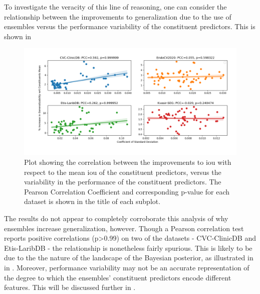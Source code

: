 To investigate the veracity of this line of reasoning, one can consider the relationship between the improvements to generalization due to the use of ensembles versus the performance variability of the constituent predictors. This is shown in  
\begin{figure}[h]
    \centering
    \hspace*{-1.9cm}\includegraphics[width=1.2\linewidth]{illustrations/ensemble_variance_relationship_statistical.png}
    \caption[Relationship between ensemble improvements and constituents' performance variability]{Plot showing the correlation between the improvements to \gls{iou} with respect to the mean \gls{iou} of the constituent predictors, versus the variability in the performance of the constituent predictors. The Pearson Correlation Coefficient and corresponding p-value for each dataset is shown in the title of each subplot.}
    \label{fig:ensemble_var}
\end{figure}

The results do not appear to completely corroborate this analysis of why ensembles increase generalization, however. Though a Pearson correlation test reports positive correlations (p>0.99) on two of the datasets - CVC-ClinicDB and Etis-LaribDB - the relationship is nonetheless fairly spurious. This is likely to be due to the the nature of the landscape of the Bayesian posterior, as illustrated in  in . Moreover, performance variability may not be an accurate representation of the degree to which the ensembles' constituent predictors encode different features. This will be discussed further in . 


